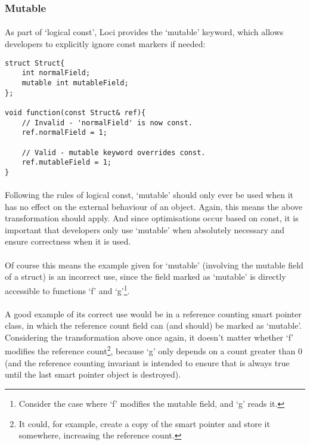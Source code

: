 \documentclass[12pt,twoside,notitlepage]{report}
\begin{document}
\subsubsection{Mutable}

\paragraph{}
As part of `logical const', Loci provides the `mutable' keyword, which allows developers to explicitly ignore const markers if needed:

\begin{lstlisting}
struct Struct{
	int normalField;
	mutable int mutableField;
};

void function(const Struct& ref){
	// Invalid - 'normalField' is now const.
	ref.normalField = 1;
	
	// Valid - mutable keyword overrides const.
	ref.mutableField = 1;
}
\end{lstlisting}

\paragraph{}
Following the rules of logical const, `mutable' should only ever be used when it has no effect on the external behaviour of an object. Again, this means the above transformation should apply. And since optimisations occur based on const, it is important that developers only use `mutable' when absolutely necessary and ensure correctness when it is used.

\paragraph{}
Of course this means the example given for `mutable' (involving the mutable field of a struct) is an incorrect use, since the field marked as `mutable' is directly accessible to functions `f' and `g'\footnote{Consider the case where `f' modifies the mutable field, and `g' reads it.}.

\paragraph{}
A good example of its correct use would be in a reference counting smart pointer class, in which the reference count field can (and should) be marked as `mutable'. Considering the transformation above once again, it doesn't matter whether `f' modifies the reference count\footnote{It could, for example, create a copy of the smart pointer and store it somewhere, increasing the reference count.}, because `g' only depends on a count greater than 0 (and the reference counting invariant is intended to ensure that is always true until the last smart pointer object is destroyed).
\end{document}
